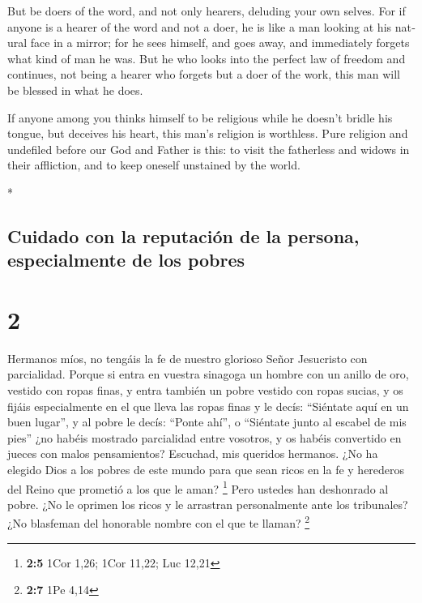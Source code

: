 \begin{paracol}{2}
\begin{otherlanguage}{english}
 But be doers of the word, and not only hearers, deluding
your own selves.  For if anyone is a hearer of the word
and not a doer, he is like a man looking at his natural face in a
mirror;  for he sees himself, and goes away, and
immediately forgets what kind of man he was.  But he who
looks into the perfect law of freedom and continues, not being a hearer
who forgets but a doer of the work, this man will be blessed in what he
does.

 If anyone among you thinks himself to be religious while
he doesn't bridle his tongue, but deceives his heart, this man's
religion is worthless.  Pure religion and undefiled
before our God and Father is this: to visit the fatherless and widows in
their affliction, and to keep oneself unstained by the world.

\end{otherlanguage}

\switchcolumn[0]*

\hypertarget{cuidado-con-la-reputaciuxf3n-de-la-persona-especialmente-de-los-pobres}{%
\subsection{Cuidado con la reputación de la persona, especialmente de
los
pobres}\label{cuidado-con-la-reputaciuxf3n-de-la-persona-especialmente-de-los-pobres}}

\hypertarget{section-2}{%
\section{2}\label{section-2}}

 Hermanos míos, no tengáis la fe de nuestro glorioso Señor
Jesucristo con parcialidad.  Porque si entra en vuestra
sinagoga un hombre con un anillo de oro, vestido con ropas finas, y
entra también un pobre vestido con ropas sucias,  y os
fijáis especialmente en el que lleva las ropas finas y le decís:
``Siéntate aquí en un buen lugar'', y al pobre le decís: ``Ponte ahí'',
o ``Siéntate junto al escabel de mis pies''  ¿no habéis
mostrado parcialidad entre vosotros, y os habéis convertido en jueces
con malos pensamientos?  Escuchad, mis queridos hermanos.
¿No ha elegido Dios a los pobres de este mundo para que sean ricos en la
fe y herederos del Reino que prometió a los que le aman? \footnote{\textbf{2:5}
  1Cor 1,26; 1Cor 11,22; Luc 12,21}  Pero ustedes han
deshonrado al pobre. ¿No le oprimen los ricos y le arrastran
personalmente ante los tribunales?  ¿No blasfeman del
honorable nombre con el que te llaman? \footnote{\textbf{2:7} 1Pe 4,14}


\end{paracol}
